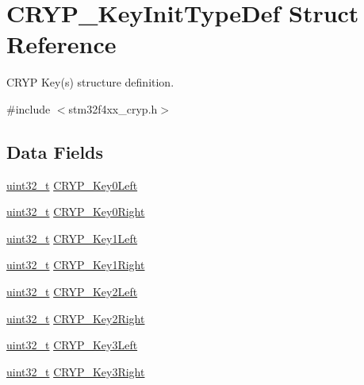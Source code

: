 \hypertarget{struct_c_r_y_p___key_init_type_def}{\section{C\-R\-Y\-P\-\_\-\-Key\-Init\-Type\-Def Struct Reference}
\label{struct_c_r_y_p___key_init_type_def}
}


C\-R\-Y\-P Key(s) structure definition.  




{\ttfamily \#include $<$stm32f4xx\-\_\-cryp.\-h$>$}

\subsection*{Data Fields}
\begin{DoxyCompactItemize}
\item 
\hyperlink{stdint_8h_a435d1572bf3f880d55459d9805097f62}{uint32\-\_\-t} \hyperlink{struct_c_r_y_p___key_init_type_def_a40168bcf70568a3fbccf282a9a6ef968}{C\-R\-Y\-P\-\_\-\-Key0\-Left}
\item 
\hyperlink{stdint_8h_a435d1572bf3f880d55459d9805097f62}{uint32\-\_\-t} \hyperlink{struct_c_r_y_p___key_init_type_def_a6c570ac1783582c73862aa8a9ec6c10d}{C\-R\-Y\-P\-\_\-\-Key0\-Right}
\item 
\hyperlink{stdint_8h_a435d1572bf3f880d55459d9805097f62}{uint32\-\_\-t} \hyperlink{struct_c_r_y_p___key_init_type_def_aca352f5af09f7d12e38d95e6c29e03bf}{C\-R\-Y\-P\-\_\-\-Key1\-Left}
\item 
\hyperlink{stdint_8h_a435d1572bf3f880d55459d9805097f62}{uint32\-\_\-t} \hyperlink{struct_c_r_y_p___key_init_type_def_a08bf87c29a0df961b92f31cf327fdc55}{C\-R\-Y\-P\-\_\-\-Key1\-Right}
\item 
\hyperlink{stdint_8h_a435d1572bf3f880d55459d9805097f62}{uint32\-\_\-t} \hyperlink{struct_c_r_y_p___key_init_type_def_acd33140c0954fda504be5ba5851b217a}{C\-R\-Y\-P\-\_\-\-Key2\-Left}
\item 
\hyperlink{stdint_8h_a435d1572bf3f880d55459d9805097f62}{uint32\-\_\-t} \hyperlink{struct_c_r_y_p___key_init_type_def_a94dd0a58f91f3b0efc09fe84f6af922d}{C\-R\-Y\-P\-\_\-\-Key2\-Right}
\item 
\hyperlink{stdint_8h_a435d1572bf3f880d55459d9805097f62}{uint32\-\_\-t} \hyperlink{struct_c_r_y_p___key_init_type_def_ae6a251405882c694e0d24a85e6d7222b}{C\-R\-Y\-P\-\_\-\-Key3\-Left}
\item 
\hyperlink{stdint_8h_a435d1572bf3f880d55459d9805097f62}{uint32\-\_\-t} \hyperlink{struct_c_r_y_p___key_init_type_def_afc24dd3ea3e7391f62ce4583ab4ae563}{C\-R\-Y\-P\-\_\-\-Key3\-Right}
\end{DoxyCompactItemize}


